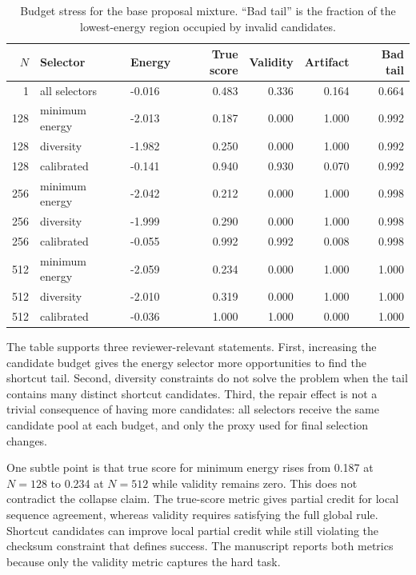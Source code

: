 \documentclass{article}
\begin{document}
\begin{table}[t]
\centering
\small
\begin{tabular}{rllrrrr}
\toprule
$N$ & Selector & Energy & True score & Validity & Artifact & Bad tail \\
\midrule
1 & all selectors & -0.016 & 0.483 & 0.336 & 0.164 & 0.664 \\
128 & minimum energy & -2.013 & 0.187 & 0.000 & 1.000 & 0.992 \\
128 & diversity & -1.982 & 0.250 & 0.000 & 1.000 & 0.992 \\
128 & calibrated & -0.141 & 0.940 & 0.930 & 0.070 & 0.992 \\
256 & minimum energy & -2.042 & 0.212 & 0.000 & 1.000 & 0.998 \\
256 & diversity & -1.999 & 0.290 & 0.000 & 1.000 & 0.998 \\
256 & calibrated & -0.055 & 0.992 & 0.992 & 0.008 & 0.998 \\
512 & minimum energy & -2.059 & 0.234 & 0.000 & 1.000 & 1.000 \\
512 & diversity & -2.010 & 0.319 & 0.000 & 1.000 & 1.000 \\
512 & calibrated & -0.036 & 1.000 & 1.000 & 0.000 & 1.000 \\
\bottomrule
\end{tabular}
\caption{Budget stress for the base proposal mixture. ``Bad tail'' is the
fraction of the lowest-energy region occupied by invalid candidates.}
\label{tab:budget-detail}
\end{table}

The table supports three reviewer-relevant statements. First, increasing the
candidate budget gives the energy selector more opportunities to find the
shortcut tail. Second, diversity constraints do not solve the problem when the
tail contains many distinct shortcut candidates. Third, the repair effect is
not a trivial consequence of having more candidates: all selectors receive the
same candidate pool at each budget, and only the proxy used for final
selection changes.

One subtle point is that true score for minimum energy rises from 0.187 at
$N=128$ to 0.234 at $N=512$ while validity remains zero. This does not
contradict the collapse claim. The true-score metric gives partial credit for
local sequence agreement, whereas validity requires satisfying the full global
rule. Shortcut candidates can improve local partial credit while still
violating the checksum constraint that defines success. The manuscript reports
both metrics because only the validity metric captures the hard task.
\end{document}
